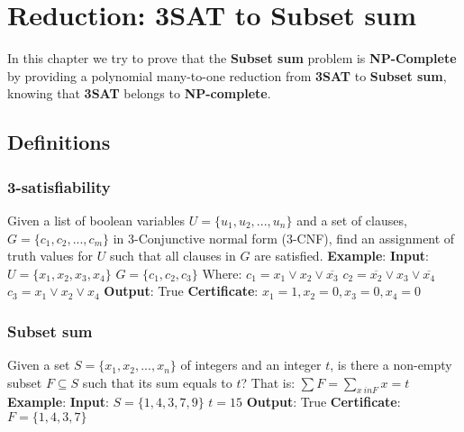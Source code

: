 \section{Reduction: 3SAT to Subset sum}
In this chapter we try to prove that the \textbf{Subset sum} problem is \textbf{NP-Complete} by providing a polynomial many-to-one reduction from \textbf{3SAT} to \textbf{Subset sum}, knowing that \textbf{3SAT} belongs to \textbf{NP-complete}.
\subsection{Definitions}
\subsubsection{3-satisfiability}
Given a list of boolean variables $U=\{u_1, u_2, ..., u_n\}$ and a set of clauses,
\newline
$G=\{c_1, c_2, ..., c_m\}$ in 3-Conjunctive normal form (3-CNF), find an assignment of truth values for $U$ such that all clauses in $G$ are satisfied.
\newline
\newline
\textbf{Example}:
\newline
\textbf{Input}: \newline
$U=\{x_1, x_2, x_3, x_4\}$\newline
$G=\{c_1, c_2, c_3\}$\newline
Where:\newline
$c_1 = x_1 \vee x_2 \vee \overline{x_3}$\newline
$c_2 = \overline{x_2} \vee x_3 \vee \overline{x_4}$\newline
$c_3 = x_1 \vee x_2 \vee x_4$\newline
\textbf{Output}: \newline
True \newline
\textbf{Certificate}: \newline
$x_1= 1, x_2=0, x_3=0, x_4=0$

\subsubsection{Subset sum}
Given a set $S=\{x_1, x_2, ..., x_n\}$ of integers and an integer $t$, is there a non-empty subset $F \subseteq S$ such that its sum equals to $t$? That is: $\sum F=\sum_{x\ in F}x=t$
\newline
\newline
\textbf{Example}:
\newline
\textbf{Input}: \newline
$S=\{1,4,3,7,9\}$\newline
$t = 15$\newline
\textbf{Output}: \newline
True \newline
\textbf{Certificate}: \newline
$F=\{1,4,3,7\}$
\newpage
